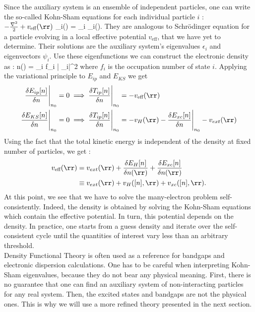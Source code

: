 Since the auxiliary system is an ensemble of independent particles, one can write the so-called Kohn-Sham equations for each individual particle $i$ :
\be
 	\( -\frac{\nabla^2}{2} + v_{\text{eff}}(\rr)\) \psi_i(\rr) = \epsilon_i \psi_i(\rr). \label{eq:KS_eqs}
\ee
They are analogous to Schrödinger equation for a particle evolving in a local effective potential $v_{\text{eff}}$, that we have yet to determine. Their solutions are the auxiliary system's eigenvalues $\epsilon_i$ and eigenvectors $\psi_i$. Use these eigenfunctions we can construct the electronic density as  :
\be
 	n(\rr) = \sum_i f_i \left| \psi_i\right|^2 \label{eq:DFT_n_vs_psi}
\ee
where $f_i$ is the occupation number of state $i$. 
Applying the variational principle to $E_{ip}$ and $E_{KS}$ we get 
\begin{align}
    \frac{\delta E_{ip}[n]}{\delta n} \Biggr|_{n_0} = 0 &\implies \frac{\delta T_{ip}[n]}{\delta n} \Biggr|_{n_0} = - v_{\text{eff}}(\rr) \\
    \frac{\delta E_{KS}[n]}{\delta n} \Biggr|_{n_0} = 0 &\implies \frac{\delta T_{ip}[n]}{\delta n} \Biggr|_{n_0} = - v_H(\rr) - \frac{\delta E_{xc}[n]}{\delta n} \Biggr|_{n_0} - v_{ext}(\rr)
\end{align}
Using the fact that the total kinetic energy is independent of the density at fixed number of particles, we get :
\begin{align}
\begin{split}
	v_{\text{eff}}(\rr) &= v_{ext}(\rr) + \frac{\delta E_H[n]}{\delta n(\rr)} + \frac{\delta E_{xc}[n]}{\delta n(\rr)} \\
	&\equiv v_{ext}(\rr) + v_H([n],\rr) + v_{xc}([n],\rr). \label{eq:KS_potential}
\end{split}
\end{align}
At this point, we see that we have to solve the many-electron problem self-consistently. Indeed, the density is obtained by solving the Kohn-Sham equations which contain the effective potential. In turn, this potential depends on the density. In practice, one starts from a guess density and iterate over the self-consistent cycle until the quantities of interest vary less than an arbitrary threshold. \\
Density Functional Theory is often used as a reference for bandgaps and electronic dispersion calculations. One has to be careful when interpreting Kohn-Sham eigenvalues, because they do not bear any physical meaning. First, there is no guarantee that one can find an auxiliary system of non-interacting particles for any real system. Then, the excited states and bandgaps are not the physical ones.\cite{fiolhais2003primer} This is why we will use a more refined theory presented in the next section.

